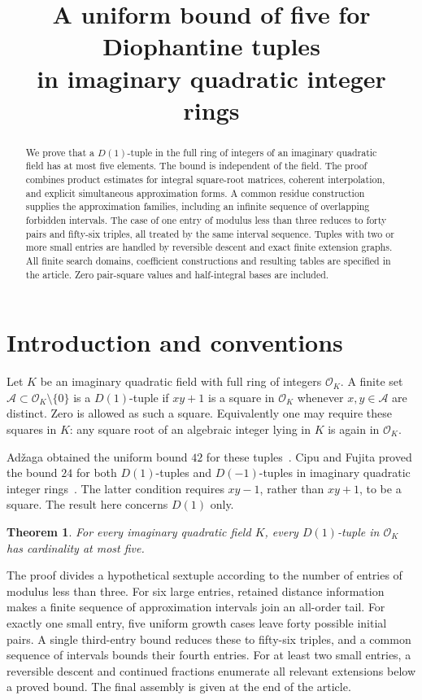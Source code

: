 \documentclass[12pt]{article}
\title{A uniform bound of five for Diophantine tuples\\in imaginary quadratic integer rings}
\author{}
\date{}
\newtheorem{theorem}{Theorem}[section]
\numberwithin{equation}{section}
\begin{document}
\maketitle
\begin{abstract}
We prove that a $D(1)$-tuple in the full ring of integers of an imaginary
quadratic field has at most five elements. The bound is independent of
the field. The proof combines product estimates for integral
square-root matrices, coherent interpolation, and explicit simultaneous
approximation forms. A common residue construction supplies the
approximation families, including an infinite sequence of overlapping
forbidden intervals. The case of one entry of modulus less than three
reduces to forty pairs and fifty-six triples, all treated by the same
interval sequence. Tuples with two or more small entries are handled
by reversible descent and exact finite extension graphs. All finite
search domains, coefficient constructions and resulting tables are
specified in the article. Zero pair-square values and half-integral
bases are included.
\end{abstract}

\section{Introduction and conventions}

Let $K$ be an imaginary quadratic field with full ring of integers
$\mathcal O_K$. A finite set $\mathcal A\subset\mathcal O_K\setminus\{0\}$
is a $D(1)$-tuple if $xy+1$ is a square in $\mathcal O_K$ whenever
$x,y\in\mathcal A$ are distinct. Zero is allowed as such a square.
Equivalently one may require these squares in $K$: any square root
of an algebraic integer lying in $K$ is again in $\mathcal O_K$.

Ad\v zaga obtained the uniform bound $42$ for these tuples~\cite{A}.
Cipu and Fujita proved the bound $24$ for both $D(1)$-tuples and
$D(-1)$-tuples in imaginary quadratic integer rings~\cite{CF}.
The latter condition requires $xy-1$, rather than $xy+1$, to be a
square. The result here concerns $D(1)$ only.

\begin{theorem}\label{thm:main}
For every imaginary quadratic field $K$, every $D(1)$-tuple in
$\mathcal O_K$ has cardinality at most five.
\end{theorem}

The proof divides a hypothetical sextuple according to the number of
entries of modulus less than three. For six large entries, retained
distance information makes a finite sequence of approximation
intervals join an all-order tail. For exactly one small entry, five
uniform growth cases leave forty possible initial pairs. A single
third-entry bound reduces these to fifty-six triples, and a common
sequence of intervals bounds their fourth entries. For at least two
small entries, a reversible descent and continued fractions enumerate
all relevant extensions below a proved bound. The final assembly is
given at the end of the article.
\end{document}
